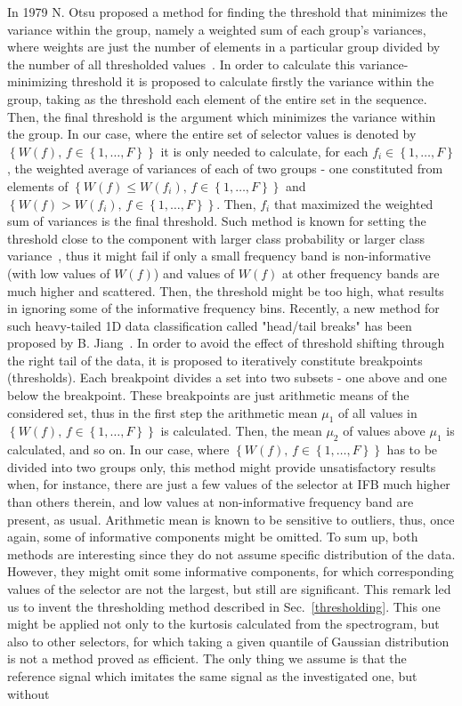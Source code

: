 \documentclass[11pt]{article} %
\begin{document}
In 1979 N. Otsu proposed a method for finding the threshold that minimizes the variance within the group, namely a weighted sum of each group's variances, where weights are just the number of elements in a particular group divided by the number of all thresholded values~\cite{Otsu}. In order to calculate this variance-minimizing threshold it is proposed to calculate firstly the variance within the group, taking as the threshold each element of the entire set in the sequence. Then, the final threshold is the argument which minimizes the variance within the group. In our case, where the entire set of selector values is denoted by $\left\{W(f),\,f\in \left\{ 1,\ldots,F\right\}\right\}$ it is only needed to calculate, for each $f_i\in \left\{ 1,\ldots,F\right\}$, the weighted average of variances of each of two groups - one constituted from elements of $\left\{W(f)\leq W\left(f_i\right),\,f\in \left\{ 1,\ldots,F\right\}\right\}$  and $\left\{W(f) > W\left(f_i\right),\,f\in \left\{ 1,\ldots,F\right\}\right\}$. Then, $f_i$ that maximized the weighted sum of variances is the final threshold. Such method is known for setting the threshold close to the component with larger class probability or larger class variance~\cite{MinVarThresholding}, thus it might fail if only a small frequency band is non-informative (with low values of $W(f)$) and values of $W(f)$ at other frequency bands are much higher and scattered. Then, the threshold might be too high, what results in ignoring some of the informative frequency bins. Recently, a new method for such heavy-tailed 1D data classification called "head/tail breaks" has been proposed by B. Jiang~\cite{HeadTailBreaks}. In order to avoid the effect of threshold shifting through the right tail of the data, it is proposed to iteratively constitute breakpoints (thresholds). Each breakpoint divides a set into two subsets - one above and one below the breakpoint. These breakpoints are just arithmetic means of the considered set, thus in the first step the arithmetic mean $\mu_1$ of all values in $\left\{W(f),\,f\in \left\{ 1,\ldots,F\right\}\right\}$ is calculated. Then, the mean $\mu_2$ of values above $\mu_1$ is calculated, and so on. In our case, where $\left\{W(f),\,f\in \left\{ 1,\ldots,F\right\}\right\}$ has to be divided into two groups only, this method might provide unsatisfactory results when, for instance, there are just a few values of the selector at IFB much higher than others therein, and low values at non-informative frequency band are present, as usual. Arithmetic mean is known to be sensitive to outliers, thus, once again, some of informative components might be omitted. To sum up, both methods are interesting since they do not assume specific distribution of the data. However, they might omit some informative components, for which corresponding values of the selector are not the largest, but still are significant. This remark led us to invent the thresholding method described in Sec.~\ref{thresholding}. This one might be applied not only to the kurtosis calculated from the spectrogram, but also to other selectors, for which taking a given quantile of Gaussian distribution is not a method proved as efficient. The only thing we assume is that the reference signal which imitates the same signal as the investigated one, but without 
\end{document}
